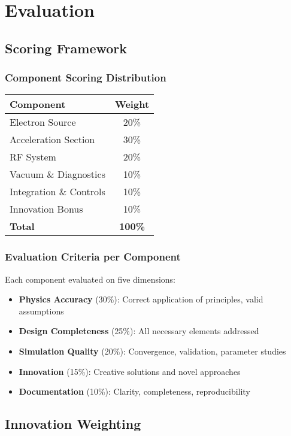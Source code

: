 
\renewcommand{\thesection}{E}
\section{Evaluation}

\subsection{Scoring Framework}

\subsubsection{Component Scoring Distribution}
\begin{tabular}{lc}
\toprule
Component & Weight \\
\midrule
Electron Source & 20\% \\
Acceleration Section & 30\% \\
RF System & 20\% \\
Vacuum \& Diagnostics & 10\% \\
Integration \& Controls & 10\% \\
Innovation Bonus & 10\% \\
\midrule
\textbf{Total} & \textbf{100\%} \\
\bottomrule
\end{tabular}

\subsubsection{Evaluation Criteria per Component}
Each component evaluated on five dimensions:
\begin{itemize}[noitemsep]
    \item \textbf{Physics Accuracy} (30\%): Correct application of principles, valid assumptions
    \item \textbf{Design Completeness} (25\%): All necessary elements addressed
    \item \textbf{Simulation Quality} (20\%): Convergence, validation, parameter studies
    \item \textbf{Innovation} (15\%): Creative solutions and novel approaches
    \item \textbf{Documentation} (10\%): Clarity, completeness, reproducibility
\end{itemize}

\subsection{Innovation Weighting}

